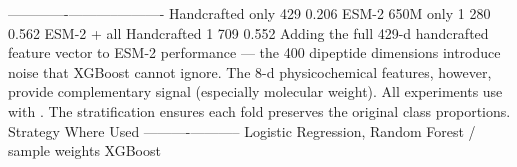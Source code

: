 {}\markdownRendererPipe{}-------------\markdownRendererPipe{}-----------\markdownRendererPipe{}----------\markdownRendererPipe{}\markdownRendererSoftLineBreak
{}\markdownRendererPipe{} Handcrafted only \markdownRendererPipe{} 429 \markdownRendererPipe{} 0.206 \markdownRendererPipe{}\markdownRendererSoftLineBreak
{}\markdownRendererPipe{} ESM-2 650M only \markdownRendererPipe{} 1 280 \markdownRendererPipe{} 0.562 \markdownRendererPipe{}\markdownRendererSoftLineBreak
{}\markdownRendererPipe{} ESM-2 + all Handcrafted \markdownRendererPipe{} 1 709 \markdownRendererPipe{} 0.552 \markdownRendererPipe{}\markdownRendererSoftLineBreak
{}\markdownRendererPipe{}  \markdownRendererPipe{}  \markdownRendererPipe{}  \markdownRendererPipe{}\markdownRendererParagraphSeparator
{}Adding the full 429-d handcrafted feature vector to ESM-2  performance — the\markdownRendererSoftLineBreak
{}400 dipeptide dimensions introduce noise that XGBoost cannot ignore. The 8-d physicochemical\markdownRendererSoftLineBreak
{}features, however, provide complementary signal (especially molecular weight).\markdownRendererInterblockSeparator
{}\markdownRendererThematicBreak{}\markdownRendererInterblockSeparator
{}
\markdownRendererSectionEnd 
\markdownRendererSectionEnd \markdownRendererSectionBegin
{}\markdownRendererInterblockSeparator
{}\markdownRendererSectionBegin
{}\markdownRendererInterblockSeparator
{}All experiments use  with . The stratification\markdownRendererSoftLineBreak
{}ensures each fold preserves the original class proportions.\markdownRendererInterblockSeparator
{}
\markdownRendererSectionEnd \markdownRendererSectionBegin
{}\markdownRendererInterblockSeparator
{}\markdownRendererPipe{} Strategy \markdownRendererPipe{} Where Used \markdownRendererPipe{}\markdownRendererSoftLineBreak
{}\markdownRendererPipe{}----------\markdownRendererPipe{}-----------\markdownRendererPipe{}\markdownRendererSoftLineBreak
{}\markdownRendererPipe{}  \markdownRendererPipe{} Logistic Regression, Random Forest \markdownRendererPipe{}\markdownRendererSoftLineBreak
{}\markdownRendererPipe{}  / sample weights \markdownRendererPipe{} XGBoost \markdownRendererPipe{}\markdownRendererSoftLineBreak

